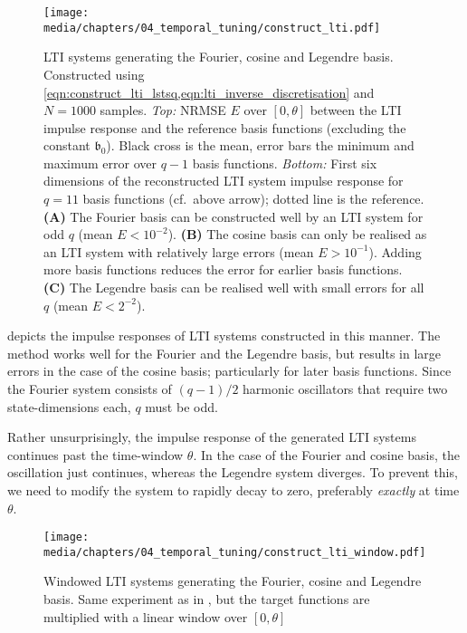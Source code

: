 \begin{figure}
	\centering
	\texttt{[image: media/chapters/04\_temporal\_tuning/construct\_lti.pdf]}
	\caption[LTI systems generating the Fourier, cosine and Legendre basis]{LTI systems generating the Fourier, cosine and Legendre basis.
	Constructed using \cref{eqn:construct_lti_lstsq,eqn:lti_inverse_discretisation} and $N = 1000$ samples.
	\emph{Top:} NRMSE $E$ over $[0, \theta]$ between the LTI impulse response and the reference basis functions (excluding the constant $\mathfrak{b}_0$). Black cross is the mean, error bars the minimum and maximum error over $q - 1$ basis functions.
	\emph{Bottom:} First six dimensions of the reconstructed LTI system impulse response for $q = 11$ basis functions (cf.~above arrow); dotted line is the reference.
	\textbf{(A)} The Fourier basis can be constructed well by an LTI system for odd $q$ (mean $E < 10^{-2}$).
	\textbf{(B)} The cosine basis can only be realised as an LTI system with relatively large errors (mean $E > 10^{-1}$). Adding more basis functions reduces the error for earlier basis functions.
	\textbf{(C)} The Legendre basis can be realised well with small errors for all $q$ (mean $E < 2^{-2}$).
	}
	\label{fig:construct_lti}
\end{figure}

 depicts the impulse responses of LTI systems constructed in this manner.
The method works well for the Fourier and the Legendre basis, but results in large errors in the case of the cosine basis; particularly for later basis functions.
Since the Fourier system consists of $(q - 1) / 2$ harmonic oscillators that require two state-dimensions each, $q$ must be odd.

Rather unsurprisingly, the impulse response of the generated LTI systems continues past the time-window $\theta$.
In the case of the Fourier and cosine basis, the oscillation just continues, whereas the Legendre system diverges.
To prevent this, we need to modify the system to rapidly decay to zero, preferably \emph{exactly} at time $\theta$.

\begin{figure}
	\centering
	\texttt{[image: media/chapters/04\_temporal\_tuning/construct\_lti\_window.pdf]}
	\caption[Windowed LTI systems generating the Fourier, cosine and Legendre basis]{
	Windowed LTI systems generating the Fourier, cosine and Legendre basis.
	Same experiment as in , but the target functions are multiplied with a linear window over $[0, \theta]$
	}
	\label{fig:construct_lti_window}
\end{figure}

